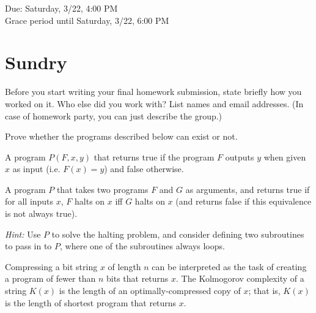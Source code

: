 \documentclass[11pt]{article}
\begin{document}
\maketitle
\fontsize{12}{15}\selectfont

\begin{center}
    Due: Saturday, 3/22, 4:00 PM \\
    Grace period until Saturday, 3/22, 6:00 PM \\
\end{center}

\section*{Sundry}
Before you start writing your final homework submission, state briefly how you worked on it.  Who else did you work with?  List names and email addresses.  (In case of homework party, you can just describe the group.)

\vspace{15pt}


Prove whether the programs described below can exist or not.

\begin{Parts}

\Part A program $P(F,x,y)$ that returns true if the program $F$ outputs $y$ when given $x$ as input (i.e. $F(x)=y$) and false otherwise.

\Part A program $P$ that takes two programs $F$ and $G$ as arguments, and returns true if for all inputs $x$, $F$ halts on $x$ iff $G$ halts on $x$ (and returns false if this equivalence is not always true).

\textit{Hint:} Use $P$ to solve the halting problem, and consider defining two subroutines to pass in to $P$, where one of the subroutines always loops.

\end{Parts}


Compressing a bit string $x$ of length $n$ can be interpreted as the task of creating a program of fewer than $n$ bits that returns $x$.
The Kolmogorov complexity of a string $K(x)$ is the length of an optimally-compressed copy of $x$; that is, $K(x)$ is the length of shortest program that returns $x$.
\end{document}
